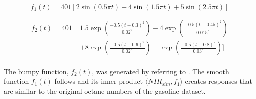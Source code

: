 \documentclass[11pt,twoside,a4paper]{article}
\begin{document}
	\begin{equation}
    	f_1(t) = 401 \left[ 2\sin(0.5\pi t) + 4\sin(1.5 \pi t) + 5\sin(2.5 \pi t) \right]
    \end{equation}

    \begin{equation}
    	\begin{split}
    		f_2(t) = 401  \Bigg[ & 1.5 \exp{\left(\frac{-0.5(t-0.3)^2}{0.02^2}\right)} - 4 \exp{\left(\frac{-0.5(t-0.45)^2}{0.015^2}\right)} \\
    				 & + 8 \exp{\left(\frac{-0.5(t-0.6)^2}{0.02^2}\right)} -  \exp{\left(\frac{-0.5(t-0.8)^2}{0.03^2}\right)} \Bigg]
    	\end{split}
    \end{equation}
    \vspace{0.2cm}\\
    
    The bumpy function, $f_2(t)$, was generated by referring to \cite{cardot_bumpyfunction_2002}. The smooth function $f_1(t)$ follows \cite{Reiss_2007b} and its inner product $\langle NIR_{sim}, f_1 \rangle$ creates responses that are similar to the original octane numbers of the gasoline dataset. 
\end{document}
